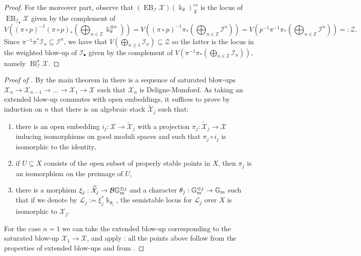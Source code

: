 \documentclass{amsart}
\newcommand{\bG}{\mathbb{G}}
\newcommand{\bZ}{\mathbb{Z}}
\newcommand{\cB}{\mathcal{B}}
\newcommand{\cI}{\mathcal{I}}
\newcommand{\cL}{\mathcal{L}}
\newcommand{\cX}{\mathcal{X}}
\newcommand{\cZ}{\mathcal{Z}}
\newcommand{\Gm}{\bG_{{\rm m}}}
\newcommand{\Bl}{\operatorname{Bl}}
\DeclareMathOperator{\EB}{EB}
\theoremstyle{definition}
\theoremstyle{definition}
\begin{document}
{\begin{proof}
    
     For the moreover part, observe that $(\EB_{\cI} \cX)(\Bbbk_{\theta} )^{ss}_{X}$ is the locus of $\EB_{\cI_\bullet} \cX$ given by the complement of \[V((\pi\circ p)^{-1}(\pi\circ p)_*(\bigoplus_{n\in \bZ} \Bbbk_{\theta}^{\otimes n})) = V((\pi\circ p)^{-1}\pi_*(\bigoplus_{n\in \bZ} \cI^n))=V(p^{-1}\pi^{-1}\pi_*(\bigoplus_{n\in \bZ} \cI^n))=:\cZ.\]
Since $\pi^{-1}\pi^*\cI_n\subseteq \cI^n$, we have that $V(\bigoplus_{n\ge 1}\cI_n)\subseteq \cZ$ so the latter is the locus in the weighted blow-up of $\cI_\bullet$ given by the complement of $V(\pi^{-1}\pi_*(\bigoplus_{n\in \bZ} \cI_n))$, namely $\Bl^\pi_\cI\cX$.
\end{proof}
\begin{proof}[Proof of ] By the main theorem in \cite{ER21} there is a sequence of saturated blow-ups $\cX_n\to \cX_{n-1}\to \ldots \to \cX_1\to \cX$ such that $\cX_n$ is Deligne-Mumford. As taking an extended blow-up commutes with open embeddings, it suffices to prove by induction on $n$ that there is an algebraic stack $\widetilde{\cX}_j$ such that:
\begin{enumerate}
    \item there is an open embedding $i_j:\cX\to\widetilde{\cX}_j$ with a projection $\pi_j:\widetilde{\cX}_j\to \cX$ inducing isomorphisms on good moduli spaces and such that $\pi_j\circ i_j$ is isomorphic to the identity,
    \item if $U\subseteq X$ consists of the open subset of properly stable points in $X$, then $\pi_j$ is an isomorphism on the preimage of $U$,
    \item there is a morphism $\xi_j:\widetilde{\cX}_j\to \cB\Gm^{\oplus j}$ and a character $\theta_j:\Gm^{\oplus j}\to \Gm$ such that if we denote by $\cL_j:=\xi_j^*\Bbbk_{\theta_j}$, the semistable locus for $\cL_j$ over $X$ is isomorphic to $\cX_j$.
\end{enumerate}
For the case $n=1$ we can take the extended blow-up corresponding to the saturated blow-up $\cX_1\to \cX$, and apply : all the points above follow from the properties of extended blow-ups and from .


\end{proof}}
\end{document}
